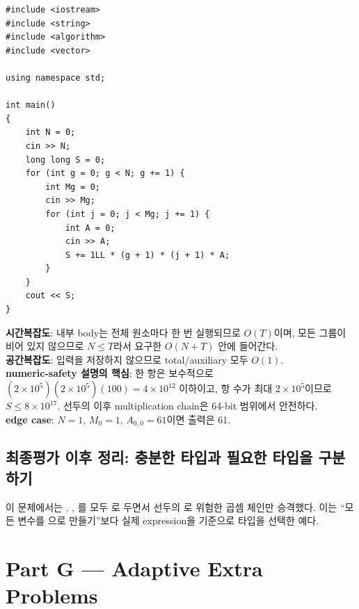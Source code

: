 \begin{answerbox}[학습자 제출 답안]
\begin{lstlisting}
#include <iostream>
#include <string>
#include <algorithm>
#include <vector>

using namespace std;

int main()
{
    int N = 0;
    cin >> N;
    long long S = 0;
    for (int g = 0; g < N; g += 1) {
        int Mg = 0;
        cin >> Mg;
        for (int j = 0; j < Mg; j += 1) {
            int A = 0;
            cin >> A;
            S += 1LL * (g + 1) * (j + 1) * A;
        }
    }
    cout << S;
}
\end{lstlisting}

\textbf{시간복잡도}: 내부 body는 전체 원소마다 한 번 실행되므로 $O(T)$이며, 모든 그룹이 비어 있지 않으므로 $N\le T$라서 요구한 $O(N+T)$ 안에 들어간다.\\
\textbf{공간복잡도}: 입력을 저장하지 않으므로 total/auxiliary 모두 $O(1)$.\\
\textbf{numeric-safety 설명의 핵심}: 한 항은 보수적으로 $(2\times10^5)(2\times10^5)(100)=4\times10^{12}$ 이하이고, 항 수가 최대 $2\times10^5$이므로 $S\le8\times10^{17}$. 선두의  이후 multiplication chain은 64-bit 범위에서 안전하다.\\
\textbf{edge case}: $N=1$, $M_0=1$, $A_{0,0}=61$이면 출력은 61.
\end{answerbox}

\subsection{최종평가 이후 정리: 충분한 타입과 필요한 타입을 구분하기}
이 문제에서는 , , 를 모두 로 두면서 선두의 로 위험한 곱셈 체인만 승격했다. 이는 ``모든 변수를 으로 만들기''보다 실제 expression을 기준으로 타입을 선택한 예다.

\section{Part G --- Adaptive Extra Problems}

